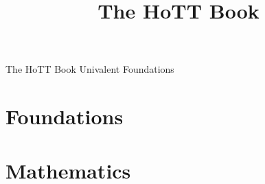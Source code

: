 \documentclass[openany,11pt]{book}
\begin{document}
\title{The HoTT Book}

%
\thispagestyle{empty}%
\vspace*{0.05\textheight}
{\centering
{\color{orange}\fontsize{70}{100}\selectfont The HoTT Book}
\vfill
{\color{orange}\fontsize{45}{60}\selectfont Univalent Foundations}\par
}
\vspace*{0.02\textheight}

\clearpage
\restoregeometry



\tableofcontents



\part{Foundations}
\label{part:foundations}





%









\part{Mathematics}
\label{part:mathematics}










%

%



\end{document}
